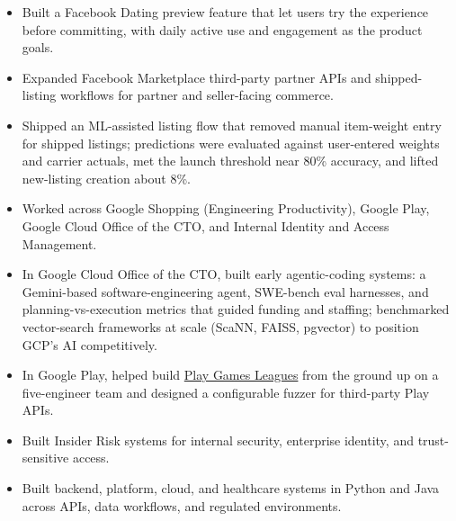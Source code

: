 
\begin{itemize}
  \item Built a Facebook Dating preview feature that let users try the experience before committing, with daily active use and engagement as the product goals.
  \item Expanded Facebook Marketplace third-party partner APIs and shipped-listing workflows for partner and seller-facing commerce.
  \item Shipped an ML-assisted listing flow that removed manual item-weight entry for shipped listings; predictions were evaluated against user-entered weights and carrier actuals, met the launch threshold near 80\% accuracy, and lifted new-listing creation about 8\%.
\end{itemize}
\begin{itemize}
  \item Worked across Google Shopping (Engineering Productivity), Google Play, Google Cloud Office of the CTO, and Internal Identity and Access Management.
  \item In Google Cloud Office of the CTO, built early agentic-coding systems: a Gemini-based software-engineering agent, SWE-bench eval harnesses, and planning-vs-execution metrics that guided funding and staffing; benchmarked vector-search frameworks at scale (ScaNN, FAISS, pgvector) to position GCP's AI competitively.
  \item In Google Play, helped build \href{https://blog.google/products-and-platforms/platforms/google-play/curation-update-september-2025/}{Play Games Leagues} from the ground up on a five-engineer team and designed a configurable fuzzer for third-party Play APIs.
  \item Built Insider Risk systems for internal security, enterprise identity, and trust-sensitive access.
\end{itemize}
\begin{itemize}
  \item Built backend, platform, cloud, and healthcare systems in Python and Java across APIs, data workflows, and regulated environments.
\end{itemize}
